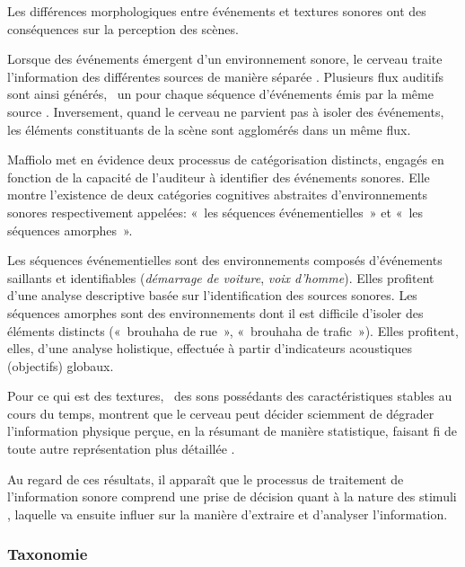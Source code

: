\documentclass[twoside,twocolumn]{article}
\begin{document}
Les différences morphologiques entre événements et textures sonores ont des conséquences sur la perception des scènes.

Lorsque des événements émergent d'un environnement sonore, le cerveau traite l'information des différentes sources de manière séparée \cite{bregman1994auditory}. Plusieurs flux auditifs sont ainsi générés, \ie~un pour chaque séquence d'événements émis par la même source \cite{carlyon2004brain}. Inversement, quand le cerveau ne parvient pas à isoler des événements, les éléments constituants de la scène sont agglomérés dans un même flux.

Maffiolo \cite{maffiolo_caracterisation_1999} met en évidence deux processus de catégorisation distincts, engagés en fonction de la capacité de l'auditeur à identifier des événements sonores. Elle montre l'existence de deux catégories cognitives abstraites d'environnements sonores respectivement appelées: «~les séquences événementielles~» et «~les séquences amorphes~».

Les séquences événementielles sont des environnements composés d'événements saillants et identifiables (\emph{démarrage de voiture}, \emph{voix d'homme}). Elles profitent d'une analyse descriptive basée sur l'identification des sources sonores. Les séquences amorphes sont des environnements dont il est difficile d'isoler des éléments distincts («~brouhaha de rue~», «~brouhaha de trafic~»). Elles profitent, elles, d'une analyse holistique, effectuée à partir d'indicateurs acoustiques (objectifs) globaux. %

Pour ce qui est des textures, \ie~des sons possédants des caractéristiques stables au cours du temps, \cite{mcdermott2011sound,mcdermott2013summary} montrent que le cerveau peut décider sciemment de dégrader l'information physique perçue, en la résumant de manière statistique, faisant fi de toute autre représentation plus détaillée \cite{nelken2013ear}.

Au regard de ces résultats, il apparaît que le processus de traitement de l'information sonore comprend une prise de décision quant à la nature des stimuli \cite{nelken2013ear,mcdermott2013summary}, laquelle va ensuite influer sur la manière d'extraire et d'analyser l'information.

\subsubsection*{Taxonomie}
\end{document}
